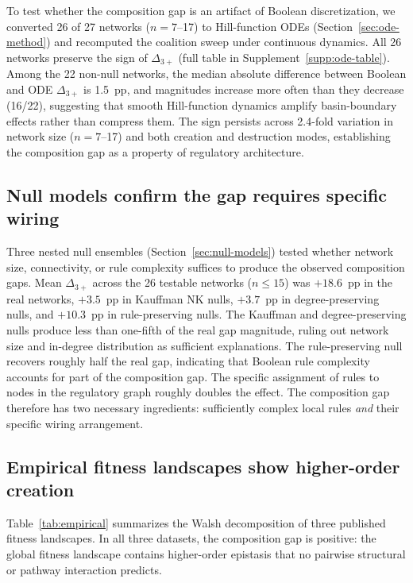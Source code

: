 \documentclass[10pt]{article}
\begin{document}
To test whether the composition gap is an artifact of Boolean
discretization, we converted 26 of 27 networks ($n = 7$--17) to
Hill-function ODEs (Section~\ref{sec:ode-method}) and recomputed
the coalition sweep under continuous dynamics. All 26 networks
preserve the sign of $\Delta_{3+}$ (full table in
Supplement~\ref{supp:ode-table}). Among the 22 non-null networks,
the median absolute difference between Boolean and ODE
$\Delta_{3+}$ is 1.5~pp, and magnitudes increase more
often than they decrease (16/22), suggesting that smooth Hill-function
dynamics amplify basin-boundary effects rather than compress them.
The sign persists across 2.4-fold variation in network size
($n = 7$--17) and both creation and destruction modes, establishing
the composition gap as a property of regulatory architecture.


\subsection{Null models confirm the gap requires specific wiring}
\label{sec:null-results}

Three nested null ensembles (Section~\ref{sec:null-models}) tested
whether network size, connectivity, or rule complexity suffices to
produce the observed composition gaps. Mean $\Delta_{3+}$ across the
26 testable networks ($n \leq 15$) was $+18.6$~pp in the real
networks, $+3.5$~pp in Kauffman NK nulls, $+3.7$~pp in
degree-preserving nulls, and $+10.3$~pp in rule-preserving nulls.
The Kauffman and degree-preserving nulls produce less than one-fifth
of the real gap magnitude, ruling out network size and in-degree
distribution as sufficient explanations. The rule-preserving null
recovers roughly half the real gap, indicating that Boolean rule
complexity accounts for part of the composition gap. The specific
assignment of rules to nodes in the regulatory graph roughly doubles
the effect. The composition gap therefore has two necessary
ingredients: sufficiently complex local rules \emph{and} their
specific wiring arrangement.


\subsection{Empirical fitness landscapes show higher-order creation}
\label{sec:empirical-results}

Table~\ref{tab:empirical} summarizes the Walsh decomposition of three
published fitness landscapes. In all three datasets, the composition
gap is positive: the global fitness landscape contains higher-order
epistasis that no pairwise structural or pathway interaction
predicts.
\end{document}
